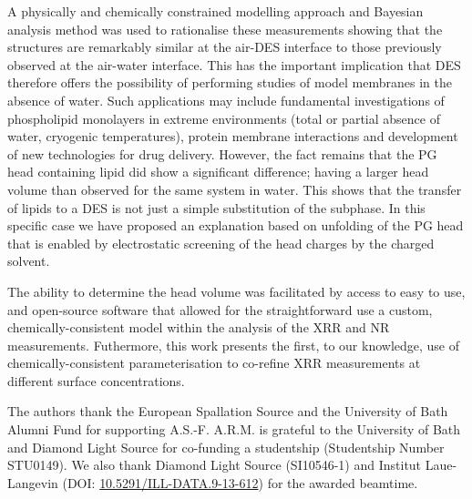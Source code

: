 \documentclass[%
 reprint,
 amsmath,amssymb,
 prl,
]{revtex4-1}
\begin{document}
A physically and chemically constrained modelling approach and Bayesian analysis method was used to rationalise these measurements showing that the structures are remarkably similar at the air-DES interface to those previously observed at the air-water interface.
This has the important implication that DES therefore offers the possibility of performing studies of model membranes in the absence of water.
Such applications may include fundamental investigations of phospholipid monolayers in extreme environments (total or partial absence of water, cryogenic temperatures), protein membrane interactions and development of new technologies for drug delivery.
However, the fact remains that the PG head containing lipid did show a significant difference; having a larger head volume than observed for the same system in water.
This shows that the transfer of lipids to a DES is not just a simple substitution of the subphase. In this specific case we have proposed an explanation based on unfolding of the PG head that is enabled by electrostatic screening of the head charges by the charged solvent.

The ability to determine the head volume was facilitated by access to easy to use, and open-source software that allowed for the straightforward use a custom, chemically-consistent model within the analysis of the XRR and NR measurements.
Futhermore, this work presents the first, to our knowledge, use of chemically-consistent parameterisation to co-refine XRR measurements at different surface concentrations.

\begin{acknowledgments}
The authors thank the European Spallation Source and the University of Bath Alumni Fund for supporting A.S.-F. A.R.M. is grateful to the University of Bath and Diamond Light Source for co-funding a studentship (Studentship Number STU0149). We also thank Diamond Light Source (SI10546-1) and Institut Laue-Langevin (DOI: \href{http://doi.org/10.5291/ILL-DATA.9-13-612}{10.5291/ILL-DATA.9-13-612}) for the awarded beamtime.
\end{acknowledgments}

\end{document}
